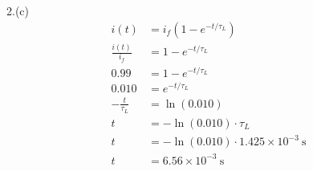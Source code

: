 \documentclass[11pt]{article}
\begin{document}
2.(c)
\begin{align*}
i(t) &= i_f (1 - e^{-t/\tau_L}) \\
\frac{i(t)}{i_f} &= 1 - e^{-t/\tau_L} \\
0.99 &= 1 - e^{-t/\tau_L} \\
0.010 &= e^{-t/\tau_L} \\
- \frac{t}{\tau_{L}} &= \ln(0.010) \\
t &= - \ln(0.010) \cdot \tau_{L} \\
t &= - \ln(0.010) \cdot 1.425 \times 10^{-3} \ \mathrm{s} \\
t &= 6.56 \times 10^{-3} \ \mathrm{s}
\end{align*}
\end{document}
